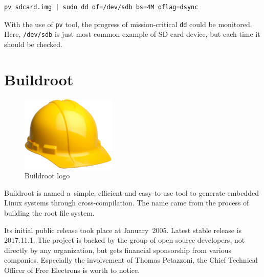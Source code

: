 \documentclass[printmode]{mgr}
\begin{document}
\begin{lstlisting}
pv sdcard.img | sudo dd of=/dev/sdb bs=4M oflag=dsync
\end{lstlisting}

With the use of \verb|pv| tool, the progress of mission-critical \verb|dd| could be monitored. Here, \verb|/dev/sdb| is just most common example of SD card device, but each time it should be checked.












\section{Buildroot}


\begin{figure}[htbp]
  \centering
    \includegraphics[width=0.4\textwidth]{buildroot-logo.png}
    \caption{Buildroot logo}
  \label{fig:buildroot-logo}
\end{figure}

Buildroot is named a~simple, efficient and easy-to-use tool to generate embedded Linux systems through cross-compilation. The name came from the process of building the root file system.

Its initial public release took place at January~2005. Latest stable release is 2017.11.1. The project is backed by the group of open source developers, not directly by any organization, but gets financial sponsorship from various companies. Especially the involvement of Thomas Petazzoni, the Chief Technical Officer of Free Electrons is worth to notice.\cite{web:buildroot-tpetazzoni}
\end{document}
